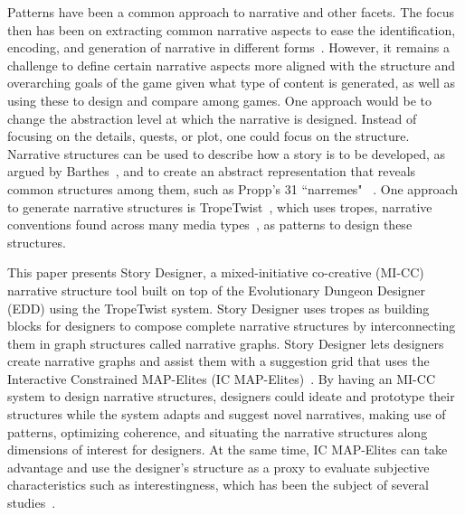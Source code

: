 Patterns have been a common approach to narrative and other facets. The focus then has been on extracting common narrative aspects to ease the identification, encoding, and generation of narrative in different forms~. However, it remains a challenge to define certain narrative aspects more aligned with the structure and overarching goals of the game given what type of content is generated, as well as using these to design and compare among games. One approach would be to change the abstraction level at which the narrative is designed. Instead of focusing on the details, quests, or plot, one could focus on the structure. Narrative structures can be used to describe how a story is to be developed, as argued by Barthes~, and to create an abstract representation that reveals common structures among them, such as Propp's 31 ``narremes" ~. One approach to generate narrative structures is TropeTwist~, which uses tropes, narrative conventions found across many media types~, as patterns to design these structures.

This paper presents Story Designer, a mixed-initiative co-creative (MI-CC) narrative structure tool built on top of the Evolutionary Dungeon Designer (EDD) using the TropeTwist system. Story Designer uses tropes as building blocks for designers to compose complete narrative structures by interconnecting them in graph structures called narrative graphs. Story Designer lets designers create narrative graphs and assist them with a suggestion grid that uses the Interactive Constrained MAP-Elites (IC MAP-Elites)~. By having an MI-CC system to design narrative structures, designers could ideate and prototype their structures while the system adapts and suggest novel narratives, making use of patterns, optimizing coherence, and situating the narrative structures along dimensions of interest for designers. At the same time, IC MAP-Elites can take advantage and use the designer's structure as a proxy to evaluate subjective characteristics such as interestingness, which has been the subject of several studies~.


